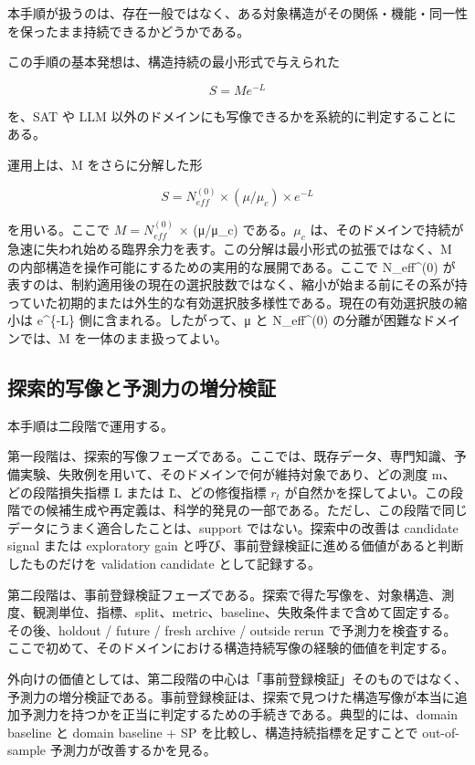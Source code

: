 \documentclass[12pt,a4paper]{article}
\begin{document}
本手順が扱うのは、存在一般ではなく、ある対象構造がその関係・機能・同一性を保ったまま持続できるかどうかである。

この手順の基本発想は、構造持続の最小形式で与えられた

\[
S = Me^{-L}
\]

を、SAT や LLM 以外のドメインにも写像できるかを系統的に判定することにある。

運用上は、M をさらに分解した形

\[
S = N_{eff}^{(0)} \times (\mu/\mu_{c}) \times e^{-L}
\]

を用いる。ここで \(M = N_{eff}^{(0)}\) × (μ/μ\_c) である。\(\mu_{c}\) は、そのドメインで持続が急速に失われ始める臨界余力を表す。この分解は最小形式の拡張ではなく、M の内部構造を操作可能にするための実用的な展開である。ここで N\_eff\^{}(0) が表すのは、制約適用後の現在の選択肢数ではなく、縮小が始まる前にその系が持っていた初期的または外生的な有効選択肢多様性である。現在の有効選択肢の縮小は e\^{}\{-L\} 側に含まれる。したがって、μ と N\_eff\^{}(0) の分離が困難なドメインでは、M を一体のまま扱ってよい。

\subsection{探索的写像と予測力の増分検証}\label{ux63a2ux7d22ux7684ux5199ux50cfux3068ux4e88ux6e2cux529bux306eux5897ux5206ux691cux8a3c}

本手順は二段階で運用する。

第一段階は、探索的写像フェーズである。ここでは、既存データ、専門知識、予備実験、失敗例を用いて、そのドメインで何が維持対象であり、どの測度 m、どの段階損失指標 L または L̂、どの修復指標 \(r_{t}\) が自然かを探してよい。この段階での候補生成や再定義は、科学的発見の一部である。ただし、この段階で同じデータにうまく適合したことは、support ではない。探索中の改善は candidate signal または exploratory gain と呼び、事前登録検証に進める価値があると判断したものだけを validation candidate として記録する。

第二段階は、事前登録検証フェーズである。探索で得た写像を、対象構造、測度、観測単位、指標、split、metric、baseline、失敗条件まで含めて固定する。その後、holdout / future / fresh archive / outside rerun で予測力を検査する。ここで初めて、そのドメインにおける構造持続写像の経験的価値を判定する。

外向けの価値としては、第二段階の中心は「事前登録検証」そのものではなく、予測力の増分検証である。事前登録検証は、探索で見つけた構造写像が本当に追加予測力を持つかを正当に判定するための手続きである。典型的には、domain baseline と domain baseline + SP を比較し、構造持続指標を足すことで out-of-sample 予測力が改善するかを見る。
\end{document}
